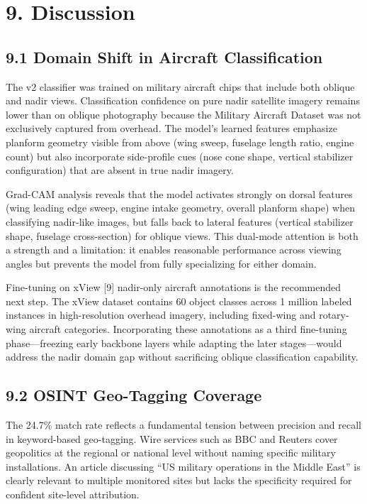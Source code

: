 \documentclass[11pt,a4paper]{article}
\begin{document}
\hypertarget{discussion}{%
\section{9. Discussion}\label{discussion}}

\hypertarget{domain-shift-in-aircraft-classification}{%
\subsection{9.1 Domain Shift in Aircraft Classification}\label{domain-shift-in-aircraft-classification}}

The v2 classifier was trained on military aircraft chips that include both oblique and nadir views. Classification confidence on pure nadir satellite imagery remains lower than on oblique photography because the Military Aircraft Dataset was not exclusively captured from overhead. The model's learned features emphasize planform geometry visible from above (wing sweep, fuselage length ratio, engine count) but also incorporate side-profile cues (nose cone shape, vertical stabilizer configuration) that are absent in true nadir imagery.

Grad-CAM analysis reveals that the model activates strongly on dorsal features (wing leading edge sweep, engine intake geometry, overall planform shape) when classifying nadir-like images, but falls back to lateral features (vertical stabilizer shape, fuselage cross-section) for oblique views. This dual-mode attention is both a strength and a limitation: it enables reasonable performance across viewing angles but prevents the model from fully specializing for either domain.

Fine-tuning on xView [9] nadir-only aircraft annotations is the recommended next step. The xView dataset contains 60 object classes across 1 million labeled instances in high-resolution overhead imagery, including fixed-wing and rotary-wing aircraft categories. Incorporating these annotations as a third fine-tuning phase---freezing early backbone layers while adapting the later stages---would address the nadir domain gap without sacrificing oblique classification capability.

\hypertarget{osint-geo-tagging-coverage}{%
\subsection{9.2 OSINT Geo-Tagging Coverage}\label{osint-geo-tagging-coverage}}

The 24.7\% match rate reflects a fundamental tension between precision and recall in keyword-based geo-tagging. Wire services such as BBC and Reuters cover geopolitics at the regional or national level without naming specific military installations. An article discussing ``US military operations in the Middle East'' is clearly relevant to multiple monitored sites but lacks the specificity required for confident site-level attribution.
\end{document}
